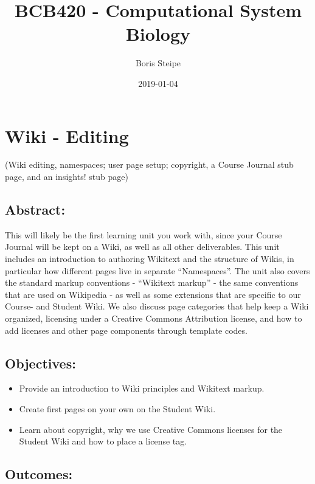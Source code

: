 \documentclass[]{book}
\title{BCB420 - Computational System Biology}
\author{Boris Steipe}
\date{2019-01-04}
\providecommand{\tightlist}{%
  \setlength{\itemsep}{0pt}\setlength{\parskip}{0pt}}
\begin{document}
\maketitle

{
\setcounter{tocdepth}{1}
\tableofcontents
}
\chapter{Wiki - Editing}\label{wiki}

(Wiki editing, namespaces; user page setup; copyright, a Course Journal
stub page, and an insights! stub page)

\section{Abstract:}\label{abstract}

This will likely be the first learning unit you work with, since your
Course Journal will be kept on a Wiki, as well as all other
deliverables. This unit includes an introduction to authoring Wikitext
and the structure of Wikis, in particular how different pages live in
separate ``Namespaces''. The unit also covers the standard markup
conventions - ``Wikitext markup'' - the same conventions that are used
on Wikipedia - as well as some extensions that are specific to our
Course- and Student Wiki. We also discuss page categories that help keep
a Wiki organized, licensing under a Creative Commons Attribution
license, and how to add licenses and other page components through
template codes.

\section{Objectives:}\label{objectives}

\begin{itemize}
\tightlist
\item
  Provide an introduction to Wiki principles and Wikitext markup.
\item
  Create first pages on your own on the Student Wiki.
\item
  Learn about copyright, why we use Creative Commons licenses for the
  Student Wiki and how to place a license tag.
\end{itemize}

\section{Outcomes:}\label{outcomes}
\end{document}
